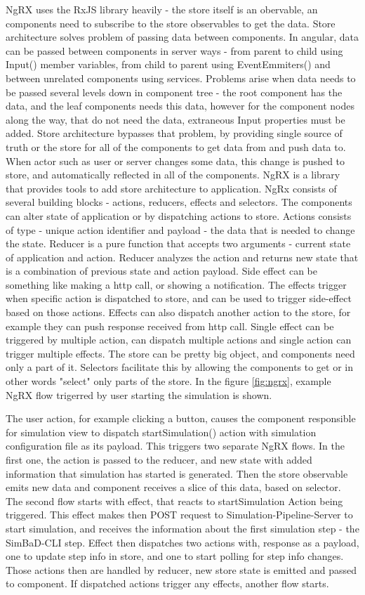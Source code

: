 NgRX uses the RxJS library heavily - the store itself is an obervable, an components need to subscribe to the store observables to get the data. Store architecture solves problem of passing data between components.
In angular, data can be passed between components in server ways - from parent to child using Input() member variables, from child to parent using EventEmmiters() and between unrelated components using services. Problems arise when data needs to be passed several levels down in component tree - the root component has the data, and the leaf components needs this data, however for the component nodes along the way, that do not need the data, extraneous Input properties must be added. Store architecture bypasses that problem, by providing single source of truth or the store for all of the components to get data from and push data to. When actor such as user or server changes some data, this change is pushed to store, and automatically reflected in all of the components. NgRX is a library that provides tools to add store architecture to application. 
NgRx consists of several building blocks - actions, reducers, effects and selectors. The components can alter state of application or by dispatching actions to store. Actions consists of type - unique action identifier and payload - the data that is needed to change the state. Reducer is a pure function that accepts two arguments - current state of application and action. Reducer analyzes the action and returns new state that is a combination of previous state and action payload. Side effect can be something like making a http call, or showing a notification. The effects trigger when specific action is dispatched to store, and can be used to trigger side-effect based on those actions. Effects can also dispatch another action to the store, for example they can push response received from http call. Single effect can be triggered by multiple action, can dispatch multiple actions and single action can trigger multiple effects. The store can be pretty big object, and components need only a part of it. Selectors facilitate this by allowing the components to get or in other words "select" only parts of the store. In the figure \ref{fig:ngrx}, example NgRX flow trigerred by user starting the simulation is shown.

The user action, for example clicking a button, causes the component responsible for simulation view to dispatch startSimulation() action with simulation configuration file as its payload. This triggers two separate NgRX flows. In the first one, the action is passed to the reducer, and new state with added information that simulation has started is generated. Then the store observable emits new data and component receives a slice of this data, based on selector. The second flow starts with effect, that reacts to startSimulation Action being triggered. This effect makes then POST request to Simulation-Pipeline-Server to start simulation, and receives the information about the first simulation step - the SimBaD-CLI step. Effect then dispatches two actions with, response as a payload, one to update step info in store, and one to start polling for step info changes. Those actions then are handled by reducer, new store state is emitted and passed to component. If dispatched actions trigger any effects, another flow starts.
